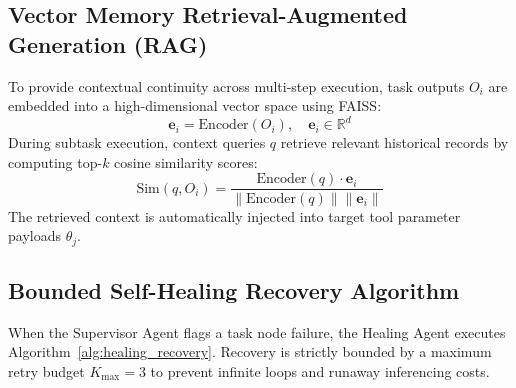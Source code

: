 \documentclass[conference]{IEEEtran}
\begin{document}
\subsection{Vector Memory Retrieval-Augmented Generation (RAG)}
To provide contextual continuity across multi-step execution, task outputs $O_i$ are embedded into a high-dimensional vector space using FAISS:
\begin{equation}
\mathbf{e}_i = \text{Encoder}(O_i), \quad \mathbf{e}_i \in \mathbb{R}^d
\end{equation}
During subtask execution, context queries $q$ retrieve relevant historical records by computing top-$k$ cosine similarity scores:
\begin{equation}
\text{Sim}(q, O_i) = \frac{\text{Encoder}(q) \cdot \mathbf{e}_i}{\|\text{Encoder}(q)\| \|\mathbf{e}_i\|}
\end{equation}
The retrieved context is automatically injected into target tool parameter payloads $\theta_j$.

\subsection{Bounded Self-Healing Recovery Algorithm}
When the Supervisor Agent flags a task node failure, the Healing Agent executes Algorithm~\ref{alg:healing_recovery}. Recovery is strictly bounded by a maximum retry budget $K_{\text{max}} = 3$ to prevent infinite loops and runaway inferencing costs.
\end{document}
